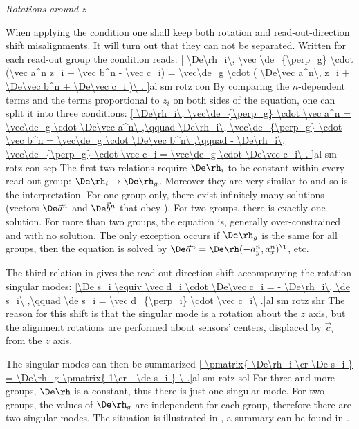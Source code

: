 \baselineskip
\indent\em{Rotations around $z$}

When applying the condition  one shall keep both rotation and read-out-direction shift misalignments. It will turn out that they can not be separated. Written for each read-out group the condition reads:
\eqref{
	\De\rh_i\, \vec \de_{\perp_g} \cdot (\vec a^n z_i + \vec b^n - \vec c_i) =
	\vec\de_g \cdot (
		\De\vec a^n\, z_i +
		\De\vec b^n +
		\De\vec c_i
	)\ .
}{al sm rotz con}
By comparing the $n$-dependent terms and the terms proportional to $z_i$ on both sides of the equation, one can split it into three conditions:
\eqref{
	\De\rh_i\, \vec\de_{\perp_g} \cdot \vec a^n = \vec\de_g \cdot \De\vec a^n\ ,\qquad
	\De\rh_i\, \vec\de_{\perp_g} \cdot \vec b^n = \vec\de_g \cdot \De\vec b^n\ ,\qquad
	- \De\rh_i\, \vec\de_{\perp_g} \cdot \vec c_i = \vec\de_g \cdot \De\vec c_i\ .
}{al sm rotz con sep}
The first two relations require $\De\rh_i$ to be constant within every read-out group: $\De\rh_i \rightarrow \De\rh_g$. Moreover they are very similar to  and so is the interpretation. For one group only, there exist infinitely many solutions (vectors $\De\vec a^n$ and $\De\vec b^n$ that obey ). For two groups, there is exactly one solution. For more than two groups, the equation is, generally over-constrained and with no solution. The only exception occurs if $\De\rh_g$ is the same for all groups, then the equation is solved by $\De\vec a^n = \De\rh (-a^n_y, a^n_x)^\T$, etc.

The third relation in  gives the read-out-direction shift accompanying the rotation singular modes:
\eqref{\De s_i \equiv \vec d_i \cdot \De\vec c_i = - \De\rh_i\, \de s_i\ ,\qquad \de s_i = \vec d_{\perp_i} \cdot \vec c_i\ .}{al sm rotz shr}
The reason for this shift is that the singular mode is a rotation about the $z$ axis, but the alignment rotations are performed about sensors' centers, displaced by $\vec c_i$ from the $z$ axis.

The singular modes can then be summarized
\eqref{
\pmatrix{
	\De\rh_i \cr
	\De s_i
	}
= \De\rh_g \pmatrix{
	1\cr
	- \de s_i
}
\ .}{al sm rotz sol}
For three and more groups, $\De\rh$ is a constant, thus there is just one singular mode. For two groups, the values of $\De\rh_g$ are independent for each group, therefore there are two singular modes. The situation is illustrated in , a summary can be found in .

